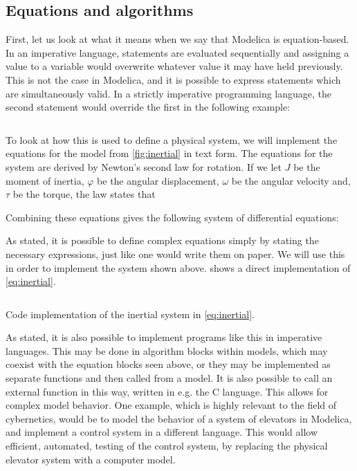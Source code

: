 \documentclass[\rootfolder/main.tex]{subfiles}
\begin{document}
\subsection{Equations and algorithms}

First, let us look at what it means when we say that Modelica is equation-based.
In an imperative language, statements are evaluated sequentially and assigning a value to a variable would overwrite whatever value it may have held previously.
This is not the case in Modelica, and it is possible to express statements which are simultaneously valid.
In a strictly imperative programming language, the second statement would override the first in the following example:

\inputminted[fontsize=\footnotesize]{Modelica}{\rootfolder/Chapters/Chapter2/Listings/simultaneous.txt}

To look at how this is used to define a physical system, we will implement the equations for the model from \cref{fig:inertial} in text form.
The equations for the system are derived by Newton's second law for rotation.
If we let $J$ be the moment of inertia, $\varphi$ be the angular displacement, $\omega$ be the angular velocity and, $\tau$ be the torque, the law states that


Combining these equations gives the following system of differential equations:


As stated, it is possible to define complex equations simply by stating the necessary expressions, just like one would write them on paper.
We will use this in order to implement the system shown above.
 shows a direct implementation of \cref{eq:inertial}.

\begin{listing}[ht]
    \inputminted[fontsize=\footnotesize]{Modelica}{\rootfolder/Models/MasterProject/Models/InertialCode.mo}
    \caption{Code implementation of the inertial system in \cref{eq:inertial}.\label{lst:inertial-code}}
\end{listing}

As stated, it is also possible to implement programs like this in imperative languages.
This may be done in algorithm blocks within models, which may coexist with the equation blocks seen above, or they may be implemented as separate functions and then called from a model.
It is also possible to call an external function in this way, written in e.g. the C language.
This allows for complex model behavior.
One example, which is highly relevant to the field of cybernetics, would be to model the behavior of a system of elevators in Modelica, and implement a control system in a different language.
This would allow efficient, automated, testing of the control system, by replacing the physical elevator system with a computer model.
\end{document}
